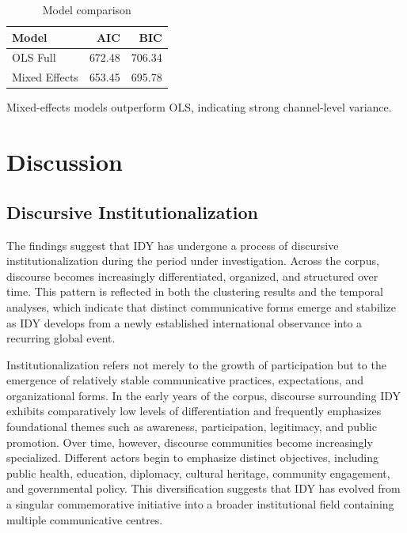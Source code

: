 \documentclass[11pt]{article}
\begin{document}
\begin{table}[H]

\centering

\begin{tabular}{lrr}

\toprule

Model & AIC & BIC \\

\midrule

OLS Full & 672.48 & 706.34 \\

Mixed Effects & 653.45 & 695.78 \\

\bottomrule

\end{tabular}

\caption{Model comparison}

\end{table}



Mixed-effects models outperform OLS, indicating strong channel-level variance.



\section{Discussion}



\subsection{Discursive Institutionalization}



The findings suggest that IDY has undergone a process of discursive institutionalization during the period under
investigation. Across the corpus, discourse becomes increasingly differentiated, organized, and structured over time.
This pattern is reflected in both the clustering results and the temporal analyses, which indicate that distinct
communicative forms emerge and stabilize as IDY develops from a newly established international observance into a
recurring global event.


Institutionalization refers not merely to the growth of participation but to the emergence of relatively stable
communicative practices, expectations, and organizational forms. In the early years of the corpus, discourse surrounding
IDY exhibits comparatively low levels of differentiation and frequently emphasizes foundational themes such as
awareness, participation, legitimacy, and public promotion. Over time, however, discourse communities become
increasingly specialized. Different actors begin to emphasize distinct objectives, including public health, education,
diplomacy, cultural heritage, community engagement, and governmental policy. This diversification suggests that IDY has
evolved from a singular commemorative initiative into a broader institutional field containing multiple communicative
centres.
\end{document}
